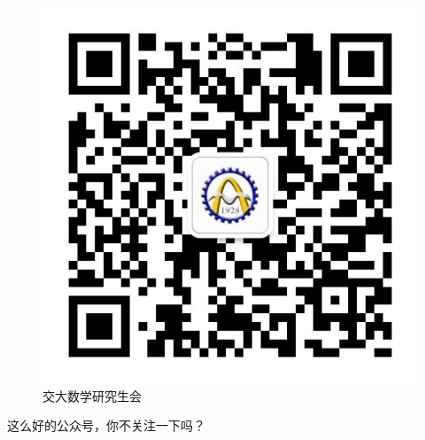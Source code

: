\documentclass{ctexart}
\begin{document}
\lipsum[1]
\begin{figure}[H]
\centering
\includegraphics[scale=0.5]{qrcode.jpeg}
\caption{交大数学研究生会}
\label{qrcode}
\end{figure}
\Huge{这么好的公众号，你不关注一下吗？}
\end{document}
